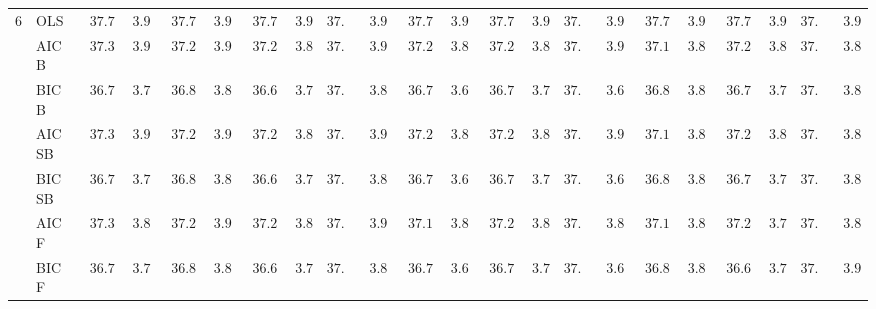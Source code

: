 \begin{tabular}{ll|ll|llllll|llllll|llllll}
6 & OLS  & $\phantom{0}37.70$ & $\phantom{0}3.91$ & $\phantom{0}37.70$ & $\phantom{0}3.91$ & $\phantom{0}37.70$ & $\phantom{0}3.91$ & $37.70$ & $\phantom{0}3.91$ & $\phantom{0}37.70$ & $\phantom{0}3.91$ & $\phantom{0}37.70$ & $\phantom{0}3.91$ & $37.70$ & $\phantom{0}3.91$ & $\phantom{0}37.70$ & $\phantom{0}3.91$ & $\phantom{0}37.70$ & $\phantom{0}3.91$ & $37.70$ & $\phantom{0}3.91$ \\
 & AIC B  & $\phantom{0}37.31$ & $\phantom{0}3.90$ & $\phantom{0}37.29$ & $\phantom{0}3.91$ & $\phantom{0}37.22$ & $\phantom{0}3.85$ & $37.39$ & $\phantom{0}3.92$ & $\phantom{0}37.21$ & $\phantom{0}3.86$ & $\phantom{0}37.22$ & $\phantom{0}3.88$ & $37.25$ & $\phantom{0}3.91$ & $\phantom{0}37.19$ & $\phantom{0}3.83$ & $\phantom{0}37.22$ & $\phantom{0}3.80$ & $37.30$ & $\phantom{0}3.88$ \\
 & BIC B  & $\phantom{0}36.75$ & $\phantom{0}3.76$ & $\phantom{0}36.84$ & $\phantom{0}3.84$ & $\phantom{0}36.67$ & $\phantom{0}3.78$ & $37.06$ & $\phantom{0}3.85$ & $\phantom{0}36.78$ & $\phantom{0}3.68$ & $\phantom{0}36.79$ & $\phantom{0}3.71$ & $37.15$ & $\phantom{0}3.67$ & $\phantom{0}36.82$ & $\phantom{0}3.82$ & $\phantom{0}36.72$ & $\phantom{0}3.70$ & $37.03$ & $\phantom{0}3.86$ \\
 & AIC SB  & $\phantom{0}37.31$ & $\phantom{0}3.90$ & $\phantom{0}37.29$ & $\phantom{0}3.91$ & $\phantom{0}37.22$ & $\phantom{0}3.85$ & $37.39$ & $\phantom{0}3.92$ & $\phantom{0}37.21$ & $\phantom{0}3.86$ & $\phantom{0}37.22$ & $\phantom{0}3.88$ & $37.25$ & $\phantom{0}3.91$ & $\phantom{0}37.19$ & $\phantom{0}3.83$ & $\phantom{0}37.22$ & $\phantom{0}3.80$ & $37.30$ & $\phantom{0}3.88$ \\
 & BIC SB  & $\phantom{0}36.75$ & $\phantom{0}3.76$ & $\phantom{0}36.84$ & $\phantom{0}3.84$ & $\phantom{0}36.67$ & $\phantom{0}3.78$ & $37.06$ & $\phantom{0}3.85$ & $\phantom{0}36.78$ & $\phantom{0}3.68$ & $\phantom{0}36.79$ & $\phantom{0}3.71$ & $37.15$ & $\phantom{0}3.67$ & $\phantom{0}36.82$ & $\phantom{0}3.82$ & $\phantom{0}36.72$ & $\phantom{0}3.70$ & $37.03$ & $\phantom{0}3.86$ \\
 & AIC F  & $\phantom{0}37.30$ & $\phantom{0}3.88$ & $\phantom{0}37.29$ & $\phantom{0}3.91$ & $\phantom{0}37.22$ & $\phantom{0}3.85$ & $37.32$ & $\phantom{0}3.93$ & $\phantom{0}37.18$ & $\phantom{0}3.82$ & $\phantom{0}37.21$ & $\phantom{0}3.87$ & $37.15$ & $\phantom{0}3.89$ & $\phantom{0}37.18$ & $\phantom{0}3.82$ & $\phantom{0}37.20$ & $\phantom{0}3.78$ & $37.21$ & $\phantom{0}3.84$ \\
 & BIC F  & $\phantom{0}36.75$ & $\phantom{0}3.76$ & $\phantom{0}36.84$ & $\phantom{0}3.84$ & $\phantom{0}36.67$ & $\phantom{0}3.78$ & $37.01$ & $\phantom{0}3.80$ & $\phantom{0}36.78$ & $\phantom{0}3.68$ & $\phantom{0}36.75$ & $\phantom{0}3.75$ & $37.10$ & $\phantom{0}3.66$ & $\phantom{0}36.82$ & $\phantom{0}3.81$ & $\phantom{0}36.68$ & $\phantom{0}3.70$ & $37.01$ & $\phantom{0}3.90$ \\

\end{tabular}
